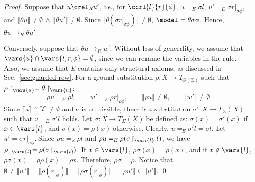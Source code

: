 \grew*
\begin{proof}
Suppose that $u \crel_R u'$, i.e.,
for $\ccrl{l}{r}{\phi}$,
$u =_E \sigma l$, $u' =_E \sigma r |_{\sigma \phi}$, and $\llbracket \theta u \rrbracket \neq \emptyset  \,\wedge\,  \llbracket \theta u' \rrbracket \neq \emptyset$.
Since $\llbracket \theta (\sigma r |_{\sigma \phi}) \rrbracket \neq \emptyset$, $\model \models \theta \sigma \phi$. Hence, $\theta u \to_R \theta u'$.

Conversely, 
suppose that $\theta u \to_R w'$.
Without loss of generality, 
we assume that $\vars{u} \cap \vars{l, r, \phi} = \emptyset$,
since we can rename the variables in the rule. 
Also, we assume that $E$ contains only structural axioms,
as discussed in Sec.~\ref{sec:guarded-rew}.
For a ground substitution $\rho : X \to T_{G(\Sigma)}$
such that $\rho\restriction_{\vars{u}} = \theta\restriction_{\vars{u}}$:
\begin{equation}
\rho u =_E \rho l,\qquad 
w' =_E \rho r |_{\rho \phi},\qquad 
\llbracket \rho u \rrbracket \neq \emptyset,\qquad
\llbracket w' \rrbracket \neq \emptyset
\end{equation}
%
Since $\llbracket u \rrbracket \cap \llbracket l \rrbracket \neq \emptyset$ and $u$ is admissible, 
there is a substitution $\sigma' : X \to T_\Sigma(X)$
such that $u =_E \sigma' l$ holds.
%
Let $\sigma : X \to T_\Sigma(X)$ be defined as:
$\sigma(x) = \sigma'(x)$ if $x \in \vars{l}$,
and
$\sigma(x) = \rho(x)$  otherwise.
%
Clearly, $u =_E \sigma' l = \sigma  l$.
Let $u' = \sigma r |_{\sigma \phi}$.
%
Since $\rho u =_E \rho l$
and
$\rho u =_E \rho (\sigma \!\restriction_{\vars{l}} l)$,
we have
$\rho \!\restriction_{\vars{l}} = \rho (\sigma \!\restriction_{\vars{l}})$.
%
If $x \in \vars{l}$, $\rho \sigma (x) = \rho(x)$,
and if $x \not\in \vars{l}$, $\rho \sigma (x) = \rho \rho (x) = \rho x$.
Therefore, $\rho \sigma = \rho$.
Notice that $\emptyset \neq \llbracket w' \rrbracket = \llbracket \rho (r |_{\phi}) \rrbracket = \llbracket \rho \sigma (r |_{\phi})\rrbracket = \llbracket \rho u'\rrbracket \subseteq \llbracket u'\rrbracket$.
\qed
\end{proof}
